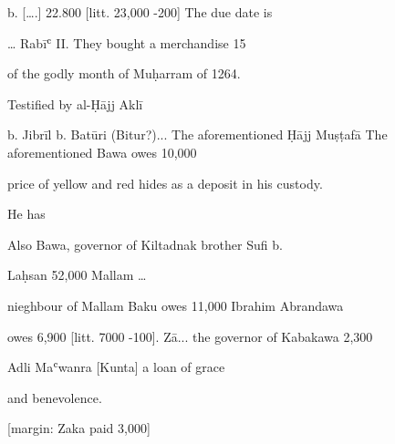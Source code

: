\documentclass[12pt]{article}
\begin{document}
\begin{pages}
\begin{Rightside}
\begin{LTR}
b. [{\dots}.] 22.800 [litt. 23,000 -200] The due date is

{\dots} Rabīʿ II. They bought a merchandise 15

of the godly month of Muḥarram of 1264.

Testified by al-Ḥājj Aklī

b. Jibrīl b. Batūri (Bitur?)... The aforementioned Ḥājj Muṣṭafā  The aforementioned Bawa owes 10,000

price of yellow and red hides as a deposit in his custody.

He has

Also Bawa,  governor of Kiltadnak brother Sufi b.

 Laḥsan 52,000 Mallam {\dots}

 nieghbour of Mallam Baku owes 11,000 Ibrahim Abrandawa

 owes 6,900 [litt. 7000 -100]. Zā... the governor of Kabakawa 2,300

 Adli Maʿwanra [Kunta] a loan of grace

 and benevolence.

 [margin: Zaka paid 3,000]

\end{LTR}

\pend
\endnumbering
\end{Rightside}

\end{pages}
\Pages
\end{document}

